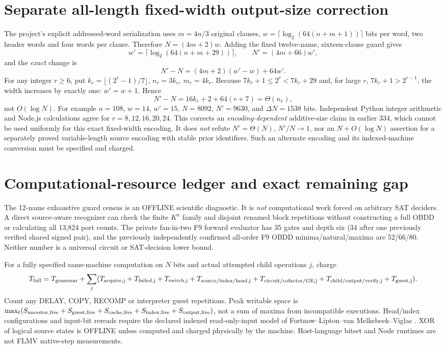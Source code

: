 \documentclass[11pt]{article}
\begin{document}
\section{Separate all-length fixed-width output-size correction}
The project's explicit addressed-word serialization uses $m=4n/3$ original clauses, $w=\lceil\log_2(64(n+m+1))\rceil$ bits per word, two header words and four words per clause. Therefore $N=(4m+2)w$. Adding the fixed twelve-name, sixteen-clause guard gives
\[
w'=\lceil\log_2(64(n+m+29))\rceil,\qquad
N'=(4m+66)w',
\]
and the \emph{exact} change is
\[
\boxed{N'-N=(4m+2)(w'-w)+64w'.}
\]
For any integer $r\ge 6$, put $k_r=\lfloor(2^r-1)/7\rfloor$, $n_r=3k_r$, $m_r=4k_r$. Because $7k_r+1\le2^r<7k_r+29$ and, for large $r$, $7k_r+1>2^{r-1}$, the width increases by exactly one: $w'=w+1$. Hence
\[
 N'-N=16k_r+2+64(r+7)=\Theta(n_r),
\]
not $O(\log N)$. For example $n=108$, $w=14$, $w'=15$, $N=8092$, $N'=9630$, and $\Delta N=1538$ bits. Independent Python integer arithmetic and Node.js calculations agree for $r=8,12,16,20,24$. This corrects an \emph{encoding-dependent} additive-size claim in earlier 334, which cannot be used uniformly for this exact fixed-width encoding. It does \emph{not} refute $N'=\Theta(N)$, $N'/N\to1$, nor an $N+O(\log N)$ assertion for a separately proved variable-length source encoding with stable prior identifiers. Such an alternate encoding and its indexed-machine conversion must be specified and charged.

\section{Computational-resource ledger and exact remaining gap}
The 12-name exhaustive guard census is an OFFLINE scientific diagnostic. It is \emph{not} computational work forced on arbitrary SAT deciders. A direct source-aware recognizer can check the finite $K^\sigma$ family and disjoint renamed block repetitions without constructing a full OBDD or calculating all 13,824 port counts. The private fan-in-two F9 forward evaluator has 35 gates and depth six (34 after one previously verified shared signed pair), and the previously independently confirmed all-order F9 OBDD minima/natural/maxima are 52/66/80. Neither number is a universal circuit or SAT-decision lower bound.

For a fully specified same-machine computation on $N$ bits and actual attempted child operations $j$, charge
\[
T_{\rm full}=T_{\rm grammar}+\sum_j(T_{\rm acquire,j}+T_{\rm failed,j}+T_{\rm switch,j}
+T_{\rm source/index/head,j}+T_{\rm circuit/cofactor/GE,j}
+T_{\rm child/output/verify,j}+T_{\rm guest,j}).
\]
Count any DELAY, COPY, RECOMP or interpreter guest repetitions. Peak writable space is $\max_t(S_{\rm ancestor,live}+S_{\rm guest,live}+S_{\rm cache,live}+S_{\rm index,live}+S_{\rm output,live})$, not a sum of maxima from incompatible executions. Head/index configurations and input-bit rereads require the declared indexed read-only-input model of Fortnow--Lipton--van Melkebeek--Viglas \cite{flmv2005}. XOR of logical source states is OFFLINE unless computed and charged physically by the machine. Host-language bitset and Node runtimes are not FLMV native-step measurements.
\end{document}
